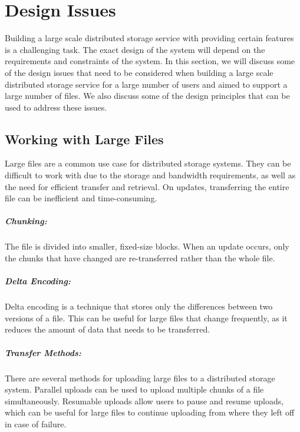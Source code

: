 \chapter{Design Issues}\label{chap:design}

Building a large scale distributed storage service with providing certain features is a challenging task. The exact design of the system will depend on the requirements and constraints of the system. In this section, we will discuss some of the design issues that need to be considered when building a large scale distributed storage service for a large number of users and aimed to support a large number of files. We also discuss some of the design principles that can be used to address these issues.

\section{Working with Large Files}
Large files are a common use case for distributed storage systems. They can be difficult to work with due to the storage and bandwidth requirements, as well as the need for efficient transfer and retrieval. On updates, transferring the entire file can be inefficient and time-consuming.

\paragraph{Chunking:} The file is divided into smaller, fixed-size blocks. When an update occurs, only the chunks that have changed are re-transferred rather than the whole file.

\paragraph{Delta Encoding:} Delta encoding is a technique that stores only the differences between two versions of a file. This can be useful for large files that change frequently, as it reduces the amount of data that needs to be transferred.

\paragraph{Transfer Methods:} There are several methods for uploading large files to a distributed storage system. Parallel uploads can be used to upload multiple chunks of a file simultaneously. Resumable uploads allow users to pause and resume uploads, which can be useful for large files to continue uploading from where they left off in case of failure. 

